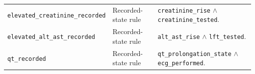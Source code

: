 \begin{longtable}{@{}p{}p{}p{}@{}}
\texttt{elevated\_creatinine\_recorded} & Recorded-state rule & \texttt{creatinine\_rise} $\land$ \texttt{creatinine\_tested}. \\
\addlinespace

\texttt{elevated\_alt\_ast\_recorded} & Recorded-state rule & \texttt{alt\_ast\_rise} $\land$ \texttt{lft\_tested}. \\
\addlinespace

\texttt{qt\_recorded} & Recorded-state rule & \texttt{qt\_prolongation\_state} $\land$ \texttt{ecg\_performed}. \\
\end{longtable}



